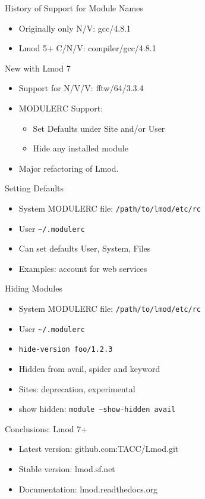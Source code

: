 \documentclass{beamer}
\begin{document}
\begin{frame}{History of Support for Module Names}
  \begin{itemize}
    \item Originally only N/V:  gcc/4.8.1
    \item Lmod 5+ C/N/V:  compiler/gcc/4.8.1
  \end{itemize}
\end{frame}

\begin{frame}{New with Lmod 7}
  \begin{itemize}
    \item Support for N/V/V:  fftw/64/3.3.4
    \item MODULERC Support:
      \begin{itemize}
        \item Set Defaults under Site and/or User
        \item Hide any installed module
      \end{itemize}
    \item Major refactoring of Lmod.
  \end{itemize}
\end{frame}

\begin{frame}{Setting Defaults}
  \begin{itemize}
    \item System MODULERC file: \texttt{/path/to/lmod/etc/rc}
    \item User \texttt{\textasciitilde/.modulerc}
    \item Can set defaults User, System, Files
    \item Examples: account for web services
  \end{itemize}
\end{frame}

\begin{frame}{Hiding Modules}
  \begin{itemize}
    \item System MODULERC file: \texttt{/path/to/lmod/etc/rc}
    \item User \texttt{\textasciitilde/.modulerc}
    \item \texttt{\color{blue}hide-version foo/1.2.3}
    \item Hidden from avail, spider and keyword
    \item Sites: deprecation, experimental
    \item show hidden: \texttt{module --show-hidden avail}
  \end{itemize}
\end{frame}


\begin{frame}{Conclusions: Lmod 7+}
  \begin{itemize}
    \item Latest version: github.com:TACC/Lmod.git
    \item Stable version: lmod.sf.net
    \item Documentation:  lmod.readthedocs.org
  \end{itemize}
\end{frame}
\end{document}
